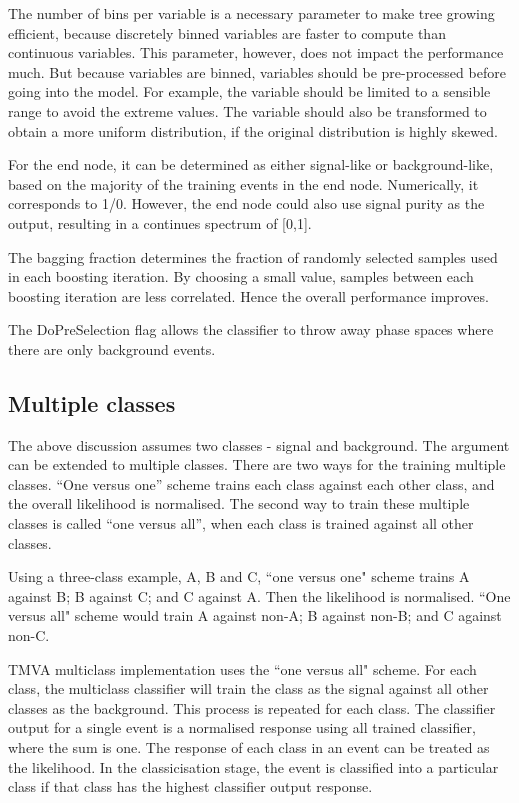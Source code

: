 The number of bins per variable is  a necessary parameter to make tree growing efficient, because discretely binned variables are faster to compute than continuous variables. This parameter, however,  does not impact the performance much. But because variables are binned, variables should be pre-processed before going into the model. For example, the variable should be limited to a sensible range to avoid the extreme values. The variable should also be transformed to obtain a more uniform distribution, if the original distribution is highly skewed.

For the end node, it can be determined as either signal-like or background-like, based on the majority of the training events in the end node. Numerically, it corresponds to 1/0. However, the end node could also use signal purity as the output, resulting in a continues spectrum of [0,1].

The bagging fraction determines the fraction of randomly selected samples used in each boosting iteration. By choosing a small value, samples between each boosting iteration are less correlated. Hence the overall performance improves.

The DoPreSelection flag allows the classifier to throw away phase spaces where there are only background events.

\subsection{Multiple classes}
\label{sec:pandoraMVAmulticlass}

The above discussion  assumes two classes - signal and background. The argument can be extended to multiple classes. There are two ways for the training multiple classes. ``One versus one'' scheme trains each class against each other class, and the overall likelihood is normalised. The second way to train these multiple classes is called ``one versus all'', when each class is trained against all other classes.

Using a three-class example, A, B and C, ``one versus one" scheme trains A against B; B against C; and C against A. Then the likelihood is normalised. ``One versus all" scheme would train A against non-A; B against non-B; and C against non-C.

TMVA multiclass implementation uses the ``one versus all" scheme. For each class, the multiclass classifier will train the class as the signal against all other classes as the background. This process is repeated for each class. The classifier output for a single event is a normalised response using all trained classifier, where the sum is one. The response of each class in an event can be treated as the likelihood. In the classicisation stage, the event is classified into a particular class if that class has the highest classifier output response.


